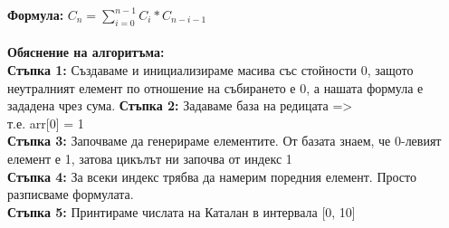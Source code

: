 \documentclass[a4paper,12pt,fleqn]{book}
\begin{document}
{\textbf{Формула:}}
$C_{n} = \sum_{i = 0}^{n - 1} C_{i} * C_{n - i - 1}$\\ \\

{\textbf{Обяснение на алгоритъма:\\}}
{\textbf{Стъпка 1:}} Създаваме и инициализираме масива със стойности 0, защото неутралният елемент по отношение на събирането е 0, а нашата формула е зададена чрез сума.
{\textbf{Стъпка 2:}} Задаваме база на редицата => \\т.е. arr[0] = 1 \\
{\textbf{Стъпка 3:}} Започваме да генерираме елементите. От базата знаем, че 0-левият елемент е 1, затова цикълът ни започва от индекс 1 \\
{\textbf{Стъпка 4:}} За всеки индекс трябва да намерим поредния елемент. Просто разписваме формулата. \\
{\textbf{Стъпка 5:}} Принтираме числата на Каталан в интервала [0, 10]
\end{document}
